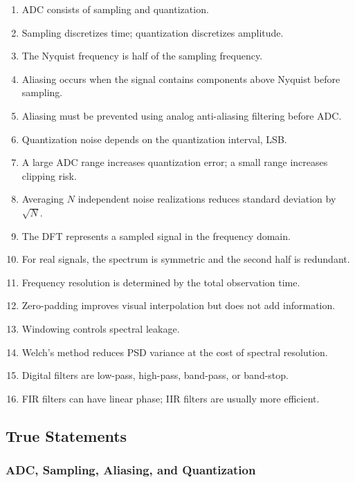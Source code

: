 \begin{enumerate}
    \item ADC consists of sampling and quantization.
    \item Sampling discretizes time; quantization discretizes amplitude.
    \item The Nyquist frequency is half of the sampling frequency.
    \item Aliasing occurs when the signal contains components above Nyquist before sampling.
    \item Aliasing must be prevented using analog anti-aliasing filtering before ADC.
    \item Quantization noise depends on the quantization interval, LSB.
    \item A large ADC range increases quantization error; a small range increases clipping risk.
    \item Averaging $N$ independent noise realizations reduces standard deviation by $\sqrt{N}$.
    \item The DFT represents a sampled signal in the frequency domain.
    \item For real signals, the spectrum is symmetric and the second half is redundant.
    \item Frequency resolution is determined by the total observation time.
    \item Zero-padding improves visual interpolation but does not add information.
    \item Windowing controls spectral leakage.
    \item Welch's method reduces PSD variance at the cost of spectral resolution.
    \item Digital filters are low-pass, high-pass, band-pass, or band-stop.
    \item FIR filters can have linear phase; IIR filters are usually more efficient.
\end{enumerate}

\subsection{True Statements}

\subsubsection{ADC, Sampling, Aliasing, and Quantization}

